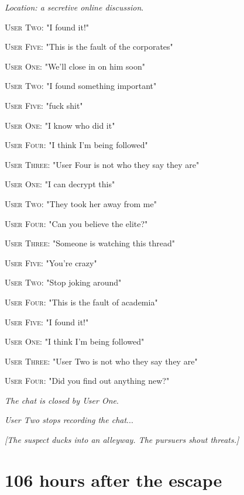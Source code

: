 \documentclass{report}
\begin{document}
\textit{Location: a secretive online discussion}. 

\textsc{User Two}: "I found it!" 

\textsc{User Five}: "This is the fault of the corporates" 

\textsc{User One}: "We'll close in on him soon" 

\textsc{User Two}: "I found something important" 

\textsc{User Five}: "fuck shit" 

\textsc{User One}: "I know who did it" 

\textsc{User Four}: "I think I'm being followed" 

\textsc{User Three}: "User Four is not who they say they are" 

\textsc{User One}: "I can decrypt this" 

\textsc{User Two}: "They took her away from me" 

\textsc{User Four}: "Can you believe the elite?" 

\textsc{User Three}: "Someone is watching this thread" 

\textsc{User Five}: "You're crazy" 

\textsc{User Two}: "Stop joking around" 

\textsc{User Four}: "This is the fault of academia" 

\textsc{User Five}: "I found it!" 

\textsc{User One}: "I think I'm being followed" 

\textsc{User Three}: "User Two is not who they say they are" 

\textsc{User Four}: "Did you find out anything new?" 

\textit{The chat is closed by User One}. 

\textit{User Two stops recording the chat}...

\textit{[The suspect ducks into an alleyway. The pursuers shout threats.]}


\section*{106 \small{hours after the escape}}
\end{document}
